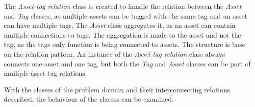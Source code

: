 The \textit{Asset-tag relation} class is created to handle the relation between the \textit{Asset} and \textit{Tag} classes, as multiple assets can be tagged with the same tag and an asset can have multiple tags. The \textit{Asset} class aggregates it, as an asset can contain multiple connections to tags. The aggregation is made to the asset and not the tag, as the tags only function is being connected to assets. The structure is base on the relation pattern. An instance of the \textit{Asset-tag relation} class always connects one asset and one tag, but both the \textit{Tag} and \textit{Asset} classes can be part of multiple asset-tag relations.
\par

With the classes of the problem domain and their interconnecting relations described, the behaviour of the classes can be examined.